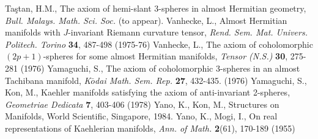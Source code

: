 \documentclass{amsart}
\newtheorem*{theorem A}{Theorem A}
\newtheorem*{theorem B}{N\"olker's Theorem}
\theoremstyle{remark}
\theoremstyle{remark}
\theoremstyle{definition}
\numberwithin{equation}{section}
\begin{document}
\begin{thebibliography}{99}
Ta\c{s}tan, H.M., The axiom of hemi-slant 3-spheres in almost Hermitian geometry, \emph{Bull. Malays. Math. Sci. Soc.} (to appear).
Vanhecke, L., Almost Hermitian manifolds with $J$-invariant Riemann curvature tensor, \emph{Rend. Sem. Mat. Univers. Politech. Torino}
\textbf{34}, 487-498 (1975-76)
Vanhecke, L., The axiom of coholomorphic $(2p+1)$-spheres for some almost Hermitian manifolds, \emph{Tensor (N.S.)}
\textbf{30}, 275-281 (1976)
Yamaguchi, S., The axiom of coholomorphic 3-spheres in an almost Tachibana manifold, \emph{K$\bar{o}$dai Math. Sem. Rep.}
\textbf{27}, 432-435. (1976)
Yamaguchi, S., Kon, M., Kaehler manifolds satisfying the axiom of anti-invariant 2-spheres, \emph{Geometriae Dedicata}
\textbf{7}, 403-406 (1978)
Yano, K., Kon, M., Structures on Manifolds, World Scientific, Singapore, 1984.
Yano, K., Mogi, I., On real representations of Kaehlerian manifolds, \emph{Ann. of Math.}
\textbf{2}(61), 170-189 (1955)

\end{thebibliography}
\end{document}
